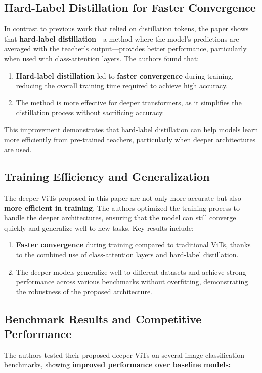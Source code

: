 \documentclass{report}
\begin{document}
	
	\subsection{Hard-Label Distillation for Faster Convergence}
	In contrast to previous work that relied on distillation tokens, the paper shows that \textbf{hard-label distillation}—a method where the model's predictions are averaged with the teacher’s output—provides better performance, particularly when used with class-attention layers. The authors found that:
	\begin{enumerate}
		\item 
		\textbf{Hard-label distillation} led to \textbf{faster convergence} during training, reducing the overall training time required to achieve high accuracy.
		
		\item 
		The method is more effective for deeper transformers, as it simplifies the distillation process without sacrificing accuracy.
	\end{enumerate}
	This improvement demonstrates that hard-label distillation can help models learn more efficiently from pre-trained teachers, particularly when deeper architectures are used.
	
	
	\subsection{Training Efficiency and Generalization}
	The deeper ViTs proposed in this paper are not only more accurate but also \textbf{more efficient in training}. The authors optimized the training process to handle the deeper architectures, ensuring that the model can still converge quickly and generalize well to new tasks. Key results include:
	
	\begin{enumerate}
		\item 
		\textbf{Faster convergence} during training compared to traditional ViTs, thanks to the combined use of class-attention layers and hard-label distillation.
		
		\item 
		The deeper models generalize well to different datasets and achieve strong performance across various benchmarks without overfitting, demonstrating the robustness of the proposed architecture.
	\end{enumerate}
	
	
	
	\subsection{Benchmark Results and Competitive Performance}
	The authors tested their proposed deeper ViTs on several image classification benchmarks, showing \textbf{improved performance over baseline models:}
	
\end{document}
